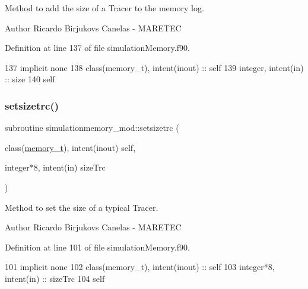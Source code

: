 Method to add the size of a Tracer to the memory log. 

\begin{DoxyAuthor}{Author}
Ricardo Birjukovs Canelas -\/ M\+A\+R\+E\+T\+EC 
\end{DoxyAuthor}


Definition at line 137 of file simulation\+Memory.\+f90.


\begin{DoxyCode}
137     \textcolor{keywordtype}{implicit none}
138     \textcolor{keywordtype}{class}(memory\_t), \textcolor{keywordtype}{intent(inout)} :: self
139     \textcolor{keywordtype}{integer}, \textcolor{keywordtype}{intent(in)} :: size
140     self%
\end{DoxyCode}
\mbox{\label{namespacesimulationmemory__mod_a48844ee646c6d29108f5bb1bdb9fd1bf}} 
\subsubsection{\texorpdfstring{setsizetrc()}{setsizetrc()}}
{\footnotesize\ttfamily subroutine simulationmemory\+\_\+mod\+::setsizetrc (\begin{DoxyParamCaption}\item[{class(\mbox{\hyperlink{structsimulationmemory__mod_1_1memory__t}{memory\+\_\+t}}), intent(inout)}]{self,  }\item[{integer$\ast$8, intent(in)}]{size\+Trc }\end{DoxyParamCaption})\hspace{0.3cm}{\ttfamily [private]}}



Method to set the size of a typical Tracer. 

\begin{DoxyAuthor}{Author}
Ricardo Birjukovs Canelas -\/ M\+A\+R\+E\+T\+EC 
\end{DoxyAuthor}


Definition at line 101 of file simulation\+Memory.\+f90.


\begin{DoxyCode}
101     \textcolor{keywordtype}{implicit none}
102     \textcolor{keywordtype}{class}(memory\_t), \textcolor{keywordtype}{intent(inout)} :: self
103     \textcolor{keywordtype}{integer*8}, \textcolor{keywordtype}{intent(in)} :: sizeTrc
104     self%
\end{DoxyCode}


